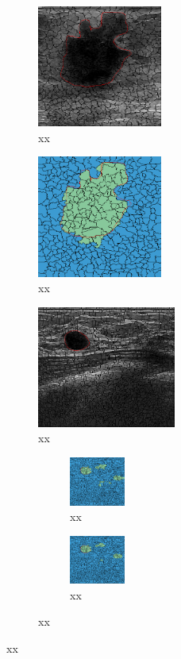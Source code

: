 \begin{figure}[h]
  \centering

  \begin{subfigure}[b]{0.20\textwidth}
    \centering
    \includegraphics[trim= 20 0 30 0, clip, height=4cm]{goodQSorigin}
    \caption{xx}
  \end{subfigure}
  \hfill
  \begin{subfigure}[b]{0.20\textwidth}
    \centering
    \includegraphics[trim= 20 0 30 0, clip, height=4cm]{goodQSseg}
    \caption{xx}
    \label{fig:results:perfect}
  \end{subfigure}
  \hfill
  \begin{subfigure}[b]{0.35\textwidth}
    \centering
    \includegraphics[trim = 0 90 0 0, clip, height=4cm]{fporigin}
    \caption{xx}
  \end{subfigure}
  \hfill
  \begin{subfigure}[b]{0.15\textwidth}
    \begin{subfigure}[b]{\textwidth}
      \includegraphics[trim = 0 90 0 0, clip, height=1.6cm]{fpnohom}
      \caption{xx}
      \label{fig:resuts:smallPWterm}
    \end{subfigure}
    \begin{subfigure}[b]{\textwidth}
      \vspace{5pt}
      \includegraphics[trim = 0 90 0 0, clip, height=1.6cm]{fpHom}
      \caption{{\small xx}}
      \label{fig:results:bigPWterm}
    \end{subfigure}
  \end{subfigure}


\end{figure}

